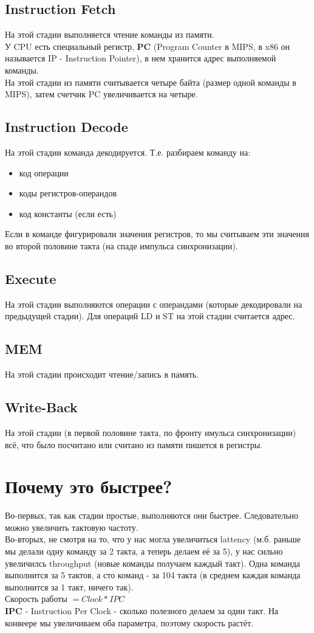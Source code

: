 \documentclass[12pt, a4paper]{article}
\begin{document}
\subsection{Instruction Fetch}
На этой стадии выполняется чтение команды из памяти.\\
У CPU есть специальный регистр, \textbf{PC} (Program Counter в MIPS, в x86 он называется IP - Instruction Pointer), в нем хранится адрес выполняемой команды.\\
На этой стадии из памяти считывается четыре байта (размер одной команды в MIPS), затем счетчик PC увеличивается на четыре.
\subsection{Instruction Decode}
На этой стадии команда декодируется. Т.е. разбираем команду на:
\begin{itemize}
    \item код операции
    \item коды регистров-операндов
    \item код константы (если есть)
\end{itemize}
Если в команде фигурировали значения регистров, то мы считываем эти значения во второй половине такта (на спаде импульса синхронизации).
\subsection{Execute}
На этой стадии выполняются операции с операндами (которые декодировали на предыдущей стадии). Для операций LD и ST на этой стадии считается адрес.
\subsection{MEM}
На этой стадии происходит чтение/запись в память. 
\subsection{Write-Back}
На этой стадии (в первой половине такта, по фронту имульса синхронизации) всё, что было посчитано или считано из памяти пишется в регистры.
\section{Почему это быстрее?}
Во-первых, так как стадии простые, выполняются они быстрее. Следовательно можно увеличить тактовую частоту.\\
Во-вторых, не смотря на то, что у нас могла увеличиться lattency (м.б. раньше мы делали одну команду за 2 такта, а теперь делаем её за 5), у нас сильно увеличилсь throughput (новые команды получаем каждый такт). Одна команда выполнится за 5 тактов, а сто команд - за 104 такта (в среднем каждая команда выполнится за 1 такт, ничего так).\\
Скорость работы $= Clock * IPC$\\
\textbf{IPC} - Instruction Per Clock - сколько полезного делаем за один такт. На конвеере мы увеличиваем оба параметра, поэтому скорость растёт.
\end{document}
